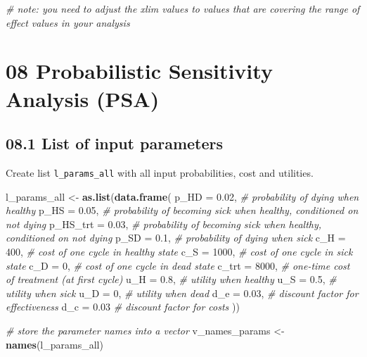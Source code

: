 \documentclass[
]{article}
\newenvironment{Shaded}{\begin{snugshade}}{\end{snugshade}}
\newcommand{\CommentTok}[1]{\textcolor[rgb]{0.56,0.35,0.01}{\textit{#1}}}
\newcommand{\DataTypeTok}[1]{\textcolor[rgb]{0.13,0.29,0.53}{#1}}
\newcommand{\DecValTok}[1]{\textcolor[rgb]{0.00,0.00,0.81}{#1}}
\newcommand{\FloatTok}[1]{\textcolor[rgb]{0.00,0.00,0.81}{#1}}
\newcommand{\KeywordTok}[1]{\textcolor[rgb]{0.13,0.29,0.53}{\textbf{#1}}}
\newcommand{\NormalTok}[1]{#1}
\newcommand{\StringTok}[1]{\textcolor[rgb]{0.31,0.60,0.02}{#1}}
\begin{document}
\begin{Shaded}
\begin{Highlighting}[]
\CommentTok{# note: you need to adjust the xlim values to values that are covering the range of effect values in your analysis}
\end{Highlighting}
\end{Shaded}

\hypertarget{probabilistic-sensitivity-analysis-psa}{%
\section{08 Probabilistic Sensitivity Analysis
(PSA)}\label{probabilistic-sensitivity-analysis-psa}}

\hypertarget{list-of-input-parameters}{%
\subsection{08.1 List of input
parameters}\label{list-of-input-parameters}}

Create list \texttt{l\_params\_all} with all input probabilities, cost
and utilities.

\begin{Shaded}
\begin{Highlighting}[]
\NormalTok{l_params_all <-}\StringTok{ }\KeywordTok{as.list}\NormalTok{(}\KeywordTok{data.frame}\NormalTok{(}
  \DataTypeTok{p_HD     =} \FloatTok{0.02}\NormalTok{,  }\CommentTok{# probability of dying when healthy}
  \DataTypeTok{p_HS     =} \FloatTok{0.05}\NormalTok{,  }\CommentTok{# probability of becoming sick when healthy, conditioned on not dying}
  \DataTypeTok{p_HS_trt =} \FloatTok{0.03}\NormalTok{,  }\CommentTok{# probability of becoming sick when healthy, conditioned on not dying}
  \DataTypeTok{p_SD     =} \FloatTok{0.1}\NormalTok{,   }\CommentTok{# probability of dying when sick}
  \DataTypeTok{c_H      =} \DecValTok{400}\NormalTok{,   }\CommentTok{# cost of one cycle in healthy state}
  \DataTypeTok{c_S      =} \DecValTok{1000}\NormalTok{,  }\CommentTok{# cost of one cycle in sick state}
  \DataTypeTok{c_D      =} \DecValTok{0}\NormalTok{,     }\CommentTok{# cost of one cycle in dead state}
  \DataTypeTok{c_trt    =} \DecValTok{8000}\NormalTok{,   }\CommentTok{# one-time cost of treatment (at first cycle)}
  \DataTypeTok{u_H      =} \FloatTok{0.8}\NormalTok{,   }\CommentTok{# utility when healthy }
  \DataTypeTok{u_S      =} \FloatTok{0.5}\NormalTok{,   }\CommentTok{# utility when sick}
  \DataTypeTok{u_D      =} \DecValTok{0}\NormalTok{,     }\CommentTok{# utility when dead}
  \DataTypeTok{d_e      =} \FloatTok{0.03}\NormalTok{,  }\CommentTok{# discount factor for effectiveness}
  \DataTypeTok{d_c      =} \FloatTok{0.03}   \CommentTok{# discount factor for costs}
\NormalTok{))}

\CommentTok{# store the parameter names into a vector}
\NormalTok{v_names_params <-}\StringTok{ }\KeywordTok{names}\NormalTok{(l_params_all)}
\end{Highlighting}
\end{Shaded}
\end{document}
